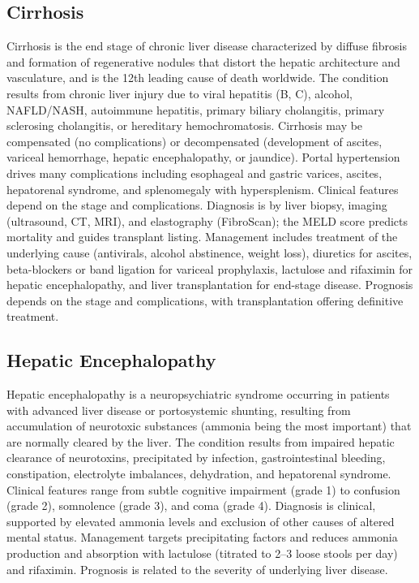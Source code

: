\subsection{Cirrhosis}
\label{sec:Cirrhosis}
Cirrhosis is the end stage of chronic liver disease characterized by diffuse fibrosis and formation of regenerative nodules that distort the hepatic architecture and vasculature, and is the 12th leading cause of death worldwide. The condition results from chronic liver injury due to viral hepatitis (B, C), alcohol, NAFLD/NASH, autoimmune hepatitis, primary biliary cholangitis, primary sclerosing cholangitis, or hereditary hemochromatosis. Cirrhosis may be compensated (no complications) or decompensated (development of ascites, variceal hemorrhage, hepatic encephalopathy, or jaundice). Portal hypertension drives many complications including esophageal and gastric varices, ascites, hepatorenal syndrome, and splenomegaly with hypersplenism. Clinical features depend on the stage and complications. Diagnosis is by liver biopsy, imaging (ultrasound, CT, MRI), and elastography (FibroScan); the MELD score predicts mortality and guides transplant listing. Management includes treatment of the underlying cause (antivirals, alcohol abstinence, weight loss), diuretics for ascites, beta-blockers or band ligation for variceal prophylaxis, lactulose and rifaximin for hepatic encephalopathy, and liver transplantation for end-stage disease. Prognosis depends on the stage and complications, with transplantation offering definitive treatment.

\subsection{Hepatic Encephalopathy}
\label{sec:Hepatic Encephalopathy}
Hepatic encephalopathy is a neuropsychiatric syndrome occurring in patients with advanced liver disease or portosystemic shunting, resulting from accumulation of neurotoxic substances (ammonia being the most important) that are normally cleared by the liver. The condition results from impaired hepatic clearance of neurotoxins, precipitated by infection, gastrointestinal bleeding, constipation, electrolyte imbalances, dehydration, and hepatorenal syndrome. Clinical features range from subtle cognitive impairment (grade 1) to confusion (grade 2), somnolence (grade 3), and coma (grade 4). Diagnosis is clinical, supported by elevated ammonia levels and exclusion of other causes of altered mental status. Management targets precipitating factors and reduces ammonia production and absorption with lactulose (titrated to 2--3 loose stools per day) and rifaximin. Prognosis is related to the severity of underlying liver disease.

